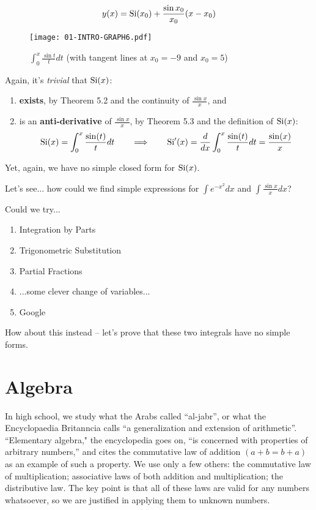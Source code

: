 $$ y(x) = {\rm Si}(x_0) + \frac{\sin x_0}{x_0}(x-x_0)$$

\begin{figure}[H]
\begin{center}
\texttt{[image: 01-INTRO-GRAPH6.pdf]}
\end{center}
\caption{$\int_0^x \frac{\sin t}{t} dt$ (with tangent lines at $x_0=-9$ and $x_0=5$)}
\end{figure}

Again, it's {\it trivial} that ${\rm Si}(x)$:

\begin{enumerate}
\item {\bf exists}, by \cite{briggs} Theorem 5.2 and the continuity of $\frac{\sin x}{x}$, and
\item is an {\bf anti-derivative} of $\frac{\sin x}{x}$, by \cite{briggs} Theorem 5.3 and the definition of ${\rm Si}(x)$:
$${\rm Si}(x) = \int_0^x \frac{\sin(t)}{t} dt \qquad\Longrightarrow\qquad {\rm Si}'(x) = \frac{d}{dx}\int_0^x \frac{\sin(t)}{t} dt = \frac{\sin(x)}{x}$$
\end{enumerate}

Yet, again, we have no simple closed form for ${\rm Si}(x)$.

Let's see... how could we find simple expressions for $\int e^{-x^2} dx$ and $\int \frac{\sin x}{x} dx$?

Could we try...

\begin{enumerate}
\item Integration by Parts
\item Trigonometric Substitution
\item Partial Fractions
\item ...some clever change of variables...
\item Google
\end{enumerate}

How about this instead -- let's prove that these two integrals have no simple forms.


\vfill\eject
\section{Algebra}

In high school, we study what the Arabs called ``al-jabr'', or what
the Encyclopaedia Britanncia calls ``a generalization and extension of
arithmetic''.  ``Elementary algebra," the encyclopedia goes on, ``is
concerned with properties of arbitrary numbers,'' and cites the
commutative law of addition $(a+b=b+a)$ as an example of such a
property.  We use only a few others: the commutative law of
multiplication; associative laws of both addition and multiplication;
the distributive law.  The key point is that all of these laws are
valid for any numbers whatsoever, so we are justified in applying them
to unknown numbers.


